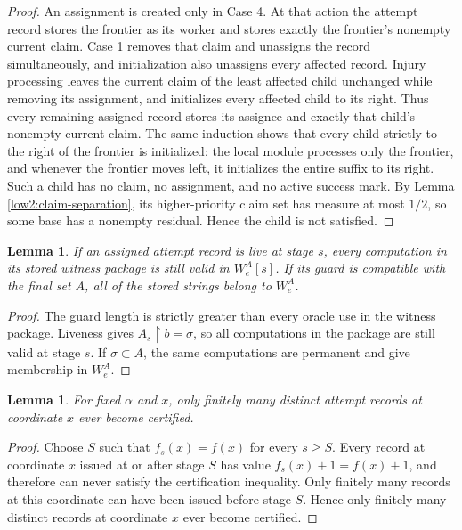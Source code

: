 \documentclass[11pt]{amsart}
\newtheorem{lemma}[theorem]{Lemma}
\begin{document}
\begin{proof}
An assignment is created only in Case 4. At that action the attempt record
stores the frontier as its worker and stores exactly the frontier's nonempty
current claim. Case 1 removes that claim and unassigns the record
simultaneously, and initialization also unassigns every affected record.
Injury processing leaves the current claim of the least affected child
unchanged while removing its assignment, and initializes every affected child
to its right. Thus every remaining assigned record stores its assignee and
exactly that child's nonempty current claim. The same induction shows that every child
strictly to the right of the frontier is initialized: the local module
processes only the frontier, and whenever the frontier moves left, it
initializes the entire suffix to its right. Such a child has no claim, no
assignment, and no active success mark. By Lemma
\ref{low2:claim-separation}, its higher-priority claim set has measure at most
$1/2$, so some base has a nonempty residual. Hence the child is not satisfied.
\end{proof}

\begin{lemma}\label{low2:certification-safety}
If an assigned attempt record is live at stage $s$, every computation in its
stored witness package is still valid in $W_e^A[s]$. If its guard is
compatible with the final set $A$, all of the stored strings belong to
$W_e^A$.
\end{lemma}

\begin{proof}
The guard length is strictly greater than every oracle use in the witness
package. Liveness gives $A_s\upharpoonright b=\sigma$, so all computations in
the package are still valid at stage $s$. If $\sigma\subset A$, the same
computations are permanent and give membership in $W_e^A$.
\end{proof}

\begin{lemma}\label{low2:finite-certification}
For fixed $\alpha$ and $x$, only finitely many distinct attempt records at
coordinate $x$ ever become certified.
\end{lemma}

\begin{proof}
Choose $S$ such that $f_s(x)=f(x)$ for every $s\geq S$. Every record at
coordinate $x$ issued at or after stage $S$ has value
$f_s(x)+1=f(x)+1$, and therefore can never satisfy the certification
inequality. Only finitely many records at this
coordinate can have been issued before stage $S$. Hence only finitely many
distinct records at coordinate $x$ ever become certified.
\end{proof}
\end{document}

